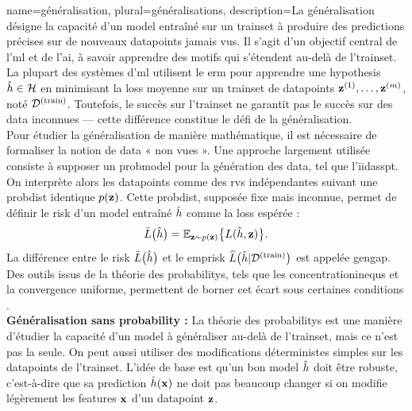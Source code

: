 {name={généralisation}, plural={généralisations}, 
	description={La généralisation désigne la capacité d’un \gls{model} entraîné sur un \gls{trainset} 
		à produire des \glspl{prediction} précises sur de nouveaux \glspl{datapoint} jamais vus. 
		Il s’agit d’un objectif central de l’\gls{ml} et de l’\gls{ai}, à savoir apprendre des motifs 
		qui s’étendent au-delà de l'\gls{trainset}. La plupart des systèmes d’\gls{ml} utilisent 
		le \gls{erm} pour apprendre une \gls{hypothesis} $\hat{h} \in \mathcal{H}$ en minimisant 
		la \gls{loss} moyenne sur un \gls{trainset} de \glspl{datapoint} ${\bf z}^{(1)}, \ldots, {\bf z}^{(m)}$, 
		noté $\mathcal{D}^{(\rm train)}$. Toutefois, le succès sur l'\gls{trainset} ne garantit pas le succès sur 
		des \gls{data} inconnues — cette différence constitue le défi de la généralisation.\\
		Pour étudier la généralisation de manière mathématique, il est nécessaire de formaliser la notion 
		de \gls{data} « non vues ». Une approche largement utilisée consiste à supposer un \gls{probmodel} 
		pour la génération des \gls{data}, tel que l'\gls{iidasspt}. On interprète alors les \glspl{datapoint} 
		comme des \glspl{rv} indépendantes suivant une \gls{probdist} identique $p({\bf z})$. 
		Cette \gls{probdist}, supposée fixe mais inconnue, permet de définir le \gls{risk} d’un \gls{model} 
		entraîné $\hat{h}$ comme la \gls{loss} espérée :
		\[
		\bar{L} \big( \hat{h} \big)=\mathbb{E}_{{\bf z} \sim p({\bf z})} \big\{ L(\hat{h}, {\bf z}) \big\}.
		\]
		La différence entre le \gls{risk} $\bar{L} \big( \hat{h} \big)$ et le \gls{emprisk} $\widehat{L}\big(\hat{h}|\mathcal{D}^{(\rm train)}\big)$ 
		est appelée \gls{gengap}. Des outils issus de la théorie des \glspl{probability}, tels que les \glspl{concentrationinequ} 
		et la convergence uniforme, permettent de borner cet écart sous certaines conditions \cite{ShalevMLBook}.\\
		\textbf{Généralisation sans \gls{probability} :} La théorie des \glspl{probability} est une manière 
		d’étudier la capacité d’un \gls{model} à généraliser au-delà de l'\gls{trainset}, mais ce n’est pas la seule. 
		On peut aussi utiliser des modifications déterministes simples sur les \glspl{datapoint} de l'\gls{trainset}. 
		L’idée de base est qu’un bon \gls{model} $\hat{h}$ doit être robuste, c’est-à-dire que sa 
		\gls{prediction} $\hat{h}({\bf x})$ ne doit pas beaucoup changer si on modifie légèrement 
		les \glspl{feature} ${\bf x}$ d’un \gls{datapoint} ${\bf z}$.\\[1mm]
}}
